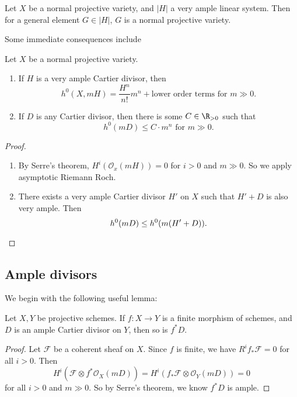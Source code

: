 \documentclass[a4paper]{article}
\begin{document}
\begin{prop}
  Let $X$ be a normal projective variety, and $|H|$ a very ample linear system. Then for a general element $G \in |H|$, $G$ is a normal projective variety.\fakeqed
\end{prop}

Some immediate consequences include
\begin{prop}
  Let $X$ be a normal projective variety.
  \begin{enumerate}
    \item If $H$ is a very ample Cartier divisor, then
      \[
        h^0(X, mH) = \frac{H^n}{n!} m^n + \text{lower order terms}\text{ for }m \gg 0.
      \]
    \item If $D$ is any Cartier divisor, then there is some $C \in \R_{>0}$ such that
    \[
      h^0(mD) \leq C \cdot m^n\text{ for }m \gg 0.
    \]
  \end{enumerate}
\end{prop}

\begin{proof}\leavevmode
  \begin{enumerate}
    \item By Serre's theorem, $H^i(\mathcal{O}_x(mH)) = 0$ for $i > 0$ and $m \gg 0$. So we apply asymptotic Riemann Roch.
    \item There exists a very ample Cartier divisor $H'$ on $X$ such that $H' + D$ is also very ample. Then
      \[
        h^0(mD) \leq h^0(m (H' + D)).\qedhere
      \]%
  \end{enumerate}
\end{proof}

\subsection{Ample divisors}
We begin with the following useful lemma:
\begin{lemma}
  Let $X, Y$ be projective schemes. If $f: X \to Y$ is a finite morphism of schemes, and $D$ is an ample Cartier divisor on $Y$, then so is $f^* D$.
\end{lemma}

\begin{proof}
  Let $\mathcal{F}$ be a coherent sheaf on $X$. Since $f$ is finite, we have $R^i f_* \mathcal{F} = 0$ for all $i > 0$. Then
  \[
    H^i(\mathcal{F} \otimes f^* \mathcal{O}_X(mD)) = H^i(f_* \mathcal{F} \otimes \mathcal{O}_Y(mD)) = 0
  \]
  for all $i > 0$ and $m \gg 0$. So by Serre's theorem, we know $f^* D$ is ample.
\end{proof}
\end{document}
